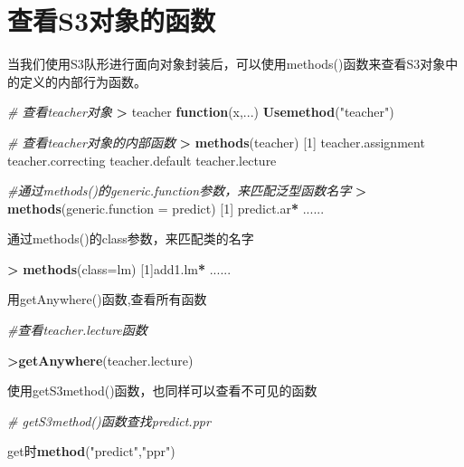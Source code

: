 \documentclass[]{book}
\newenvironment{Shaded}{\begin{snugshade}}{\end{snugshade}}
\newcommand{\KeywordTok}[1]{\textcolor[rgb]{0.13,0.29,0.53}{\textbf{#1}}}
\newcommand{\DataTypeTok}[1]{\textcolor[rgb]{0.13,0.29,0.53}{#1}}
\newcommand{\DecValTok}[1]{\textcolor[rgb]{0.00,0.00,0.81}{#1}}
\newcommand{\StringTok}[1]{\textcolor[rgb]{0.31,0.60,0.02}{#1}}
\newcommand{\CommentTok}[1]{\textcolor[rgb]{0.56,0.35,0.01}{\textit{#1}}}
\newcommand{\ControlFlowTok}[1]{\textcolor[rgb]{0.13,0.29,0.53}{\textbf{#1}}}
\newcommand{\OperatorTok}[1]{\textcolor[rgb]{0.81,0.36,0.00}{\textbf{#1}}}
\newcommand{\NormalTok}[1]{#1}
\begin{document}
\section{查看S3对象的函数}\label{s3}

当我们使用S3队形进行面向对象封装后，可以使用methods()函数来查看S3对象中的定义的内部行为函数。

\begin{Shaded}
\begin{Highlighting}[]
\CommentTok{# 查看teacher对象}
\OperatorTok{>}\StringTok{ }\NormalTok{teacher}
\ControlFlowTok{function}\NormalTok{(x,...) }\KeywordTok{Usemethod}\NormalTok{(}\StringTok{"teacher"}\NormalTok{)}

\CommentTok{# 查看teacher对象的内部函数}
\OperatorTok{>}\StringTok{ }\KeywordTok{methods}\NormalTok{(teacher)}
\NormalTok{[}\DecValTok{1}\NormalTok{] teacher.assignment teacher.correcting teacher.default teacher.lecture}

\CommentTok{#通过methods()的generic.function参数，来匹配泛型函数名字}
\OperatorTok{>}\StringTok{ }\KeywordTok{methods}\NormalTok{(}\DataTypeTok{generic.function =}\NormalTok{ predict)}
\NormalTok{[}\DecValTok{1}\NormalTok{] predict.ar}\OperatorTok{*}\StringTok{ }\NormalTok{......}
\end{Highlighting}
\end{Shaded}

通过methods()的class参数，来匹配类的名字

\begin{Shaded}
\begin{Highlighting}[]
\OperatorTok{>}\StringTok{ }\KeywordTok{methods}\NormalTok{(}\DataTypeTok{class=}\NormalTok{lm)}
\NormalTok{[}\DecValTok{1}\NormalTok{]add1.lm}\OperatorTok{*}\StringTok{ }\NormalTok{......}
\end{Highlighting}
\end{Shaded}

用getAnywhere()函数,查看所有函数

\begin{Shaded}
\begin{Highlighting}[]
\CommentTok{#查看teacher.lecture函数}

\OperatorTok{>}\KeywordTok{getAnywhere}\NormalTok{(teacher.lecture)}
\end{Highlighting}
\end{Shaded}

使用getS3method()函数，也同样可以查看不可见的函数

\begin{Shaded}
\begin{Highlighting}[]
\CommentTok{# getS3method()函数查找predict.ppr}

\NormalTok{get时}\KeywordTok{method}\NormalTok{(}\StringTok{"predict"}\NormalTok{,}\StringTok{"ppr"}\NormalTok{)}
\end{Highlighting}
\end{Shaded}
\end{document}
